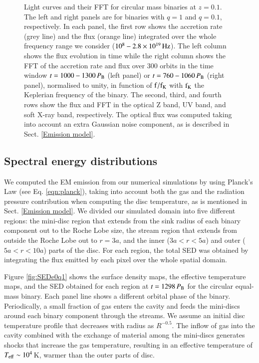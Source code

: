 \documentclass{aa}
\begin{document}
\begin{figure}
        \caption{\label{fig:LCse0} Light curves and their FFT for circular mass binaries at $z = 0.1$.  The left and right panels are for binaries with $q=1$ and $q=0.1$, respectively. In each panel, the first row shows the accretion rate (grey line) and the flux (orange line) integrated over the whole frequency range we consider ($10^8-2.8 \times 10^{19} \, \rm {Hz}$). The left column shows the flux evolution in time while the right column shows the FFT of the accretion rate and flux over 300 orbits in the time window $t=1000-1300 \,P_{\rm B}$ (left panel) or $t=760-1060 \,P_{\rm B}$ (right panel), normalised to unity, in function of $\rm f/f_{K}$ with $\rm f_{K}$ the Keplerian frequency of the binary. The second, third, and fourth rows show the flux and FFT in the optical Z band, UV band, and soft X-ray band, respectively. The optical flux was computed taking into account an extra Gaussian noise component, as is described in Sect. \ref{Emission model}.
 }
\end{figure}
\subsection{Spectral energy distributions}
\label{Results_SEDsLCs}

We computed the EM emission from our numerical simulations by using Planck's Law (see Eq. \ref{eqn:planck}), taking into account both the gas and the radiation pressure contribution when computing the disc temperature, as is mentioned in Sect. \ref{Emission model}. We divided our simulated domain into five different regions: the mini-disc region that extends from the sink radius of each binary component out to the Roche Lobe size, the stream region that extends from outside the Roche Lobe out to $r = 3a$, and the inner ($3a < r < 5a $) and outer ($5a < r < 10a $) parts of the disc.
For each region, the total SED was obtained by integrating the flux emitted by each pixel over the whole spatial domain.

Figure \ref{fig:SEDe0q1} shows the surface density maps, the effective temperature maps, and the SED obtained for each region at $t = 1298 \, P_{\rm B}$ for the circular equal-mass binary. Each panel line shows a different orbital phase of the binary. Periodically, a small fraction of gas enters the cavity and feeds the mini-discs around each binary component through the streams.  
We assume an initial disc temperature profile that decreases with radius as $R^{-0.5}$.
The inflow of gas into the cavity combined with the exchange of material among the mini-discs generates shocks that increase the gas temperature, resulting in an effective temperature of $T_{\rm eff} \sim 10^4 \,$K, warmer than the outer parts of disc. 
\end{document}
